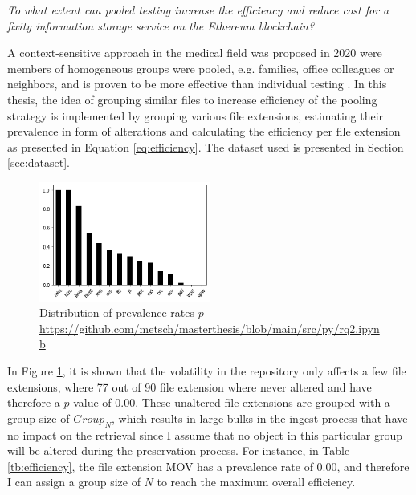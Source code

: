 \textit{To what extent can pooled testing increase the efficiency and reduce cost for a fixity information storage service on the Ethereum blockchain?}

A context-sensitive approach in the medical field was proposed in 2020 were members of homogeneous groups were pooled, e.g. families, office colleagues or neighbors, and is proven to be more effective than individual testing \cite[4]{deckert2020simulation}. In this thesis, the idea of grouping similar files to increase efficiency of the pooling strategy is implemented by grouping various file extensions, estimating their prevalence in form of alterations and calculating the efficiency per file extension as presented in Equation \ref{eq:efficiency}. The dataset used is presented in Section \ref{sec:dataset}.
\begin{figure}[H]%
    \centering
    \caption{Distribution of prevalence rates $p$ \url{https://github.com/metsch/masterthesis/blob/main/src/py/rq2.ipynb}}\label{fig:p-distribution}
    \includegraphics[width=0.5\textwidth]{graphics/p-distribution.png}
\end{figure}
In Figure \ref{fig:p-distribution}, it is shown that the volatility in the repository only affects a few file extensions, where 77 out of 90 file extension where never altered and have therefore a $p$ value of 0.00. These unaltered file extensions are grouped with a group size of $Group_N$, which results in large bulks in the ingest process that have no impact on the retrieval since I assume that no object in this particular group will be altered during the preservation process. For instance, in Table \ref{tb:efficiency}, the file extension MOV has a prevalence rate of 0.00, and therefore I can assign a group size of $N$ to reach the maximum overall efficiency.
